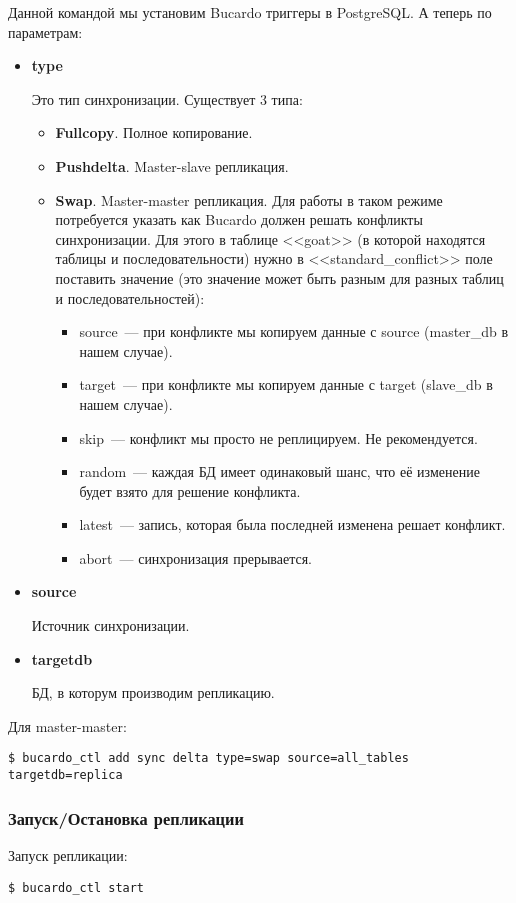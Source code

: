 Данной командой мы установим Bucardo триггеры в PostgreSQL. А теперь по параметрам:
\begin{itemize}
\item \textbf{type}

Это тип синхронизации. Существует 3 типа:
\begin{itemize}
\item \textbf{Fullcopy}. Полное копирование.
\item \textbf{Pushdelta}. Master-slave репликация.
\item \textbf{Swap}. Master-master репликация.
Для работы в таком режиме потребуется указать как Bucardo должен решать конфликты синхронизации.
Для этого в таблице <<goat>> (в которой находятся таблицы и последовательности) нужно в <<standard\_conflict>>
поле поставить значение (это значение может быть разным для разных таблиц и последовательностей):
\begin{itemize}
\item source~--- при конфликте мы копируем данные с source (master\_db в нашем случае).
\item target~--- при конфликте мы копируем данные с target (slave\_db в нашем случае).
\item skip~--- конфликт мы просто не реплицируем. Не рекомендуется.
\item random~--- каждая БД имеет одинаковый шанс, что её изменение будет взято для решение конфликта.
\item latest~--- запись, которая была последней изменена решает конфликт.
\item abort~--- синхронизация прерывается.
\end{itemize}
\end{itemize}

\item \textbf{source}

Источник синхронизации.

\item \textbf{targetdb}

БД, в которум производим репликацию.
\end{itemize}

Для master-master:
\begin{lstlisting}[label=lst:bucardo10,caption=Настройка синхронизации]
$ bucardo_ctl add sync delta type=swap source=all_tables targetdb=replica
\end{lstlisting}

\subsubsection{Запуск/Остановка репликации}
Запуск репликации:
\begin{lstlisting}[label=lst:bucardo11,caption=Запуск репликации]
$ bucardo_ctl start
\end{lstlisting}

